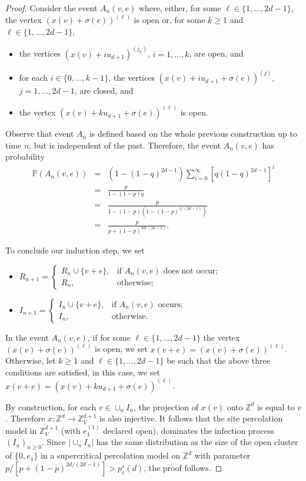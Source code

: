 \documentclass{aptpub}
\newcommand{\Z}{\mathbb{Z}}
\newcommand{\Pp}{\mathbb{P}}
\begin{document}
\begin{proof}
Consider the event $A_n(v,e)$ where, either, for some $\ell \in \{1, \dots, 2d-1 \}$, the vertex $(x(v)+\sigma(e))^{(\ell)}$ is open or, for some $k \geq 1$ and $\ell \in \{1, \dots, 2d-1\}$,
\begin{itemize}
    \item the vertices $\left( x(v) + iu_{d+1} \right)^{(j_n)}$, $i = 1, \dots, k$, are open, and
    \item for each $i \in \{0, \dots, k-1\}$, the vertices $\left( x(v) + i u_{d+1} + \sigma(e) \right)^{(j)}$, $j = 1, \dots, 2d-1$, are closed, and
    \item the vertex $\left( x(v) + ku_{d+1} + \sigma(e) \right)^{(\ell)}$ is open. %
\end{itemize}
Observe that event $A_n$ is defined based on the whole previous construction up to time $n$, but is independent of the past. Therefore, the event $A_n(v,e)$ has probability   
\begin{eqnarray*}
    \Pp(A_n(v,e)) &=& \left(1 - (1-q)^{2d-1}\right) \sum_{i=0}^{\infty} \left[q(1-q)^{2d-1}\right]^i \\
    &=& \frac{p}{1 - (1-p)q}\\
    &=& \frac{p}{1-(1-p)\left(1-(1-p)^{1/(2d-1)}\right)} \\
    &=& \frac{p}{ p + (1-p)^{2d/(2d-1)} }.
\end{eqnarray*}

To conclude our induction step, we set 
\begin{itemize}
    \item $R_{n+1} = 
    \begin{cases} R_n \cup \{v+e\}, &\text{if } A_n(v,e) \text{ does not occur};\\
                  R_n, & \text{otherwise};
    \end{cases}$
    \item $I_{n+1} = 
    \begin{cases} I_n \cup \{v+e\}, &\text{if } A_n(v,e) \text{ occurs};\\
                  I_n, & \text{otherwise}.
    \end{cases}$
\end{itemize}
In the event $A_n(v,e)$, if for some $\ell \in \{1, \dots, 2d-1 \}$ the vertex $(x(v)+\sigma(e))^{(\ell)}$ is open, we set $x(v+e) =( x(v)+\sigma(e) )^{(\ell)}$. Otherwise, let $k \geq 1$ and $\ell \in \{1, \dots, 2d-1\}$ be such that the above three conditions are satisfied, in this case, we set $x(v+e) =( x(v)+ k u_{d+1} + \sigma(e) )^{(\ell)}$.

By construction, for each $v \in \cup_n I_n$, the projection of $x(v)$ onto $\Z^d$ is equal to $v$. Therefore $x: \Z^d \longrightarrow \Z^{d+1}_V$ is also injective. It follows that the site percolation model in $\Z^{d+1}_V$ (with $e_1^{(1)}$ declared open), dominates the infection process $(I_n)_{n \geq 0}$. 
Since  $|\cup_n I_n|$ has the same distribution as the size of the open cluster of $\{0, e_1\}$ in a supercritical percolation model on $\Z^d$ with parameter $p / [p + (1-p)^{2d/(2d-1)}] > p^s_c(d)$, the proof follows.
\end{proof}
\end{document}
